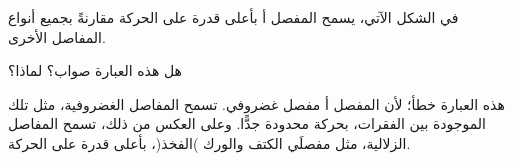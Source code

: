
\begin{question}

\begin{instance}

\begin{frq}

\begin{stem}
في الشكل الآتي، يسمح المفصل أ بأعلى قدرة على الحركة مقارنةً بجميع أنواع المفاصل الأخرى. \par
{}هل هذه العبارة صواب؟ لماذا؟\par

\end{stem}

\begin{answer}
هذه العبارة خطأ؛ لأن المفصل أ مفصل غضروفي. تسمح المفاصل الغضروفية، مثل تلك الموجودة بين الفقرات، بحركة محدودة جدًّا. وعلى العكس من ذلك، تسمح المفاصل الزلالية، مثل مفصلَي الكتف والورك )الفخذ(، بأعلى قدرة على الحركة.\par

\end{answer}

\end{frq}

\end{instance}

\end{question}
